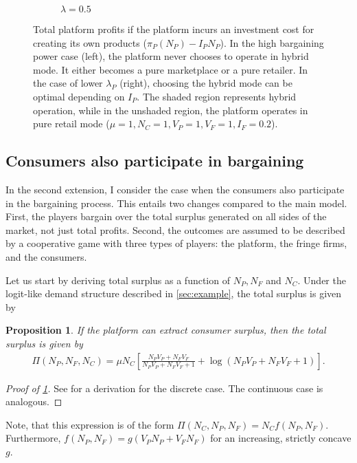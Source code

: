 \documentclass[a4paper]{article}
\newtheorem{proposition}{Proposition}
\begin{document}
\begin{figure}
\begin{subfigure}[b]{0.45\textwidth}
        \caption{$\lambda = 0.5$}
    \end{subfigure}
    \caption{Total platform profits if the platform incurs an investment cost for creating its own products ($\pi_P(N_P) - I_P N_P$). In the high bargaining power case (left), the platform never chooses to operate in hybrid mode. It either becomes a pure marketplace or a pure retailer. In the case of lower $\lambda_P$ (right), choosing the hybrid mode can be optimal depending on $I_P$. The shaded region represents hybrid operation, while in the unshaded region, the platform operates in pure retail mode ($\mu = 1, N_C = 1, V_P = 1, V_F = 1, I_F = 0.2$).}
    \label{fig:equilibrium_low_lambda_entry_fees}
\end{figure}


\subsection{Consumers also participate in bargaining}

In the second extension, I consider the case when the consumers also participate in the bargaining process.
This entails two changes compared to the main model.
First, the players bargain over the total surplus generated on all sides of the market, not just total profits.
Second, the outcomes are assumed to be described by a cooperative game with three types of players: the platform, the fringe firms, and the consumers.

Let us start by deriving total surplus as a function of $N_P, N_F$ and $N_C$.
Under the logit-like demand structure described in \cref{sec:example}, the total surplus is given by
\begin{proposition}
    \label{prop:profits_total_surplus}
    If the platform can extract consumer surplus, then the total surplus is given by
    \begin{align*}
        \Pi(N_P, N_F, N_C) = \mu N_C \left[ \frac{N_P V_P + N_F V_F}{N_P V_P + N_F V_F + 1} + \log(N_P V_P + N_F V_F + 1) \right].
    \end{align*}
\end{proposition}
\begin{proof}[Proof of \cref{prop:profits_total_surplus}]
    See \textcite{small1981applied} for a derivation for the discrete case.
    The continuous case is analogous.
\end{proof}
Note, that this expression is of the form $\Pi(N_C, N_P, N_F) = N_C f(N_P, N_F)$.
Furthermore, $f(N_P, N_F) = g(V_P N_P + V_F N_F)$ for an increasing, strictly concave $g$.
\end{document}
